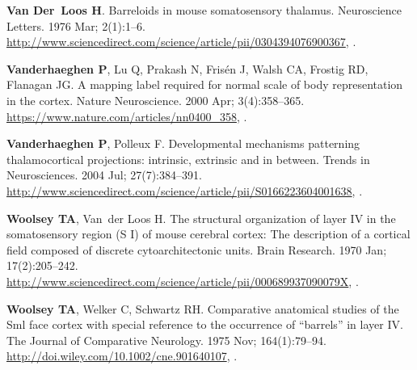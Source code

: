 \documentclass[9pt,lineno]{elife}
\begin{document}
\begin{thebibliography}{31}
\textbf{\color{eLifeMediumGrey} Van Der~Loos H}.
\newblock Barreloids in mouse somatosensory thalamus.
\newblock Neuroscience Letters.  1976 Mar; 2(1):1--6.
\newblock
  \urlprefix\url{http://www.sciencedirect.com/science/article/pii/0304394076900367},
  \href{10.1016/0304-3940(76)90036-7}{\doiprefix
  }.

\textbf{\color{eLifeMediumGrey} Vanderhaeghen P}, Lu Q, Prakash N, Fris{\'e}n
  J, Walsh CA, Frostig RD, Flanagan JG.
\newblock A mapping label required for normal scale of body representation in
  the cortex.
\newblock Nature Neuroscience.  2000 Apr; 3(4):358--365.
\newblock \urlprefix\url{https://www.nature.com/articles/nn0400_358},
  \href{10.1038/73929}{\doiprefix {}}.

\textbf{\color{eLifeMediumGrey} Vanderhaeghen P}, Polleux F.
\newblock Developmental mechanisms patterning thalamocortical projections:
  intrinsic, extrinsic and in between.
\newblock Trends in Neurosciences.  2004 Jul; 27(7):384--391.
\newblock
  \urlprefix\url{http://www.sciencedirect.com/science/article/pii/S0166223604001638},
  \href{10.1016/j.tins.2004.05.009}{\doiprefix
  }.

\textbf{\color{eLifeMediumGrey} Woolsey TA}, Van~der Loos H.
\newblock The structural organization of layer {IV} in the somatosensory region
  ({S} {I}) of mouse cerebral cortex: {The} description of a cortical field
  composed of discrete cytoarchitectonic units.
\newblock Brain Research.  1970 Jan; 17(2):205--242.
\newblock
  \urlprefix\url{http://www.sciencedirect.com/science/article/pii/000689937090079X},
  \href{10.1016/0006-8993(70)90079-X}{\doiprefix
  }.

\textbf{\color{eLifeMediumGrey} Woolsey TA}, Welker C, Schwartz RH.
\newblock Comparative anatomical studies of the {Sml} face cortex with special
  reference to the occurrence of {\textquotedblleft}barrels{\textquotedblright}
  in layer {IV}.
\newblock The Journal of Comparative Neurology.  1975 Nov; 164(1):79--94.
\newblock \urlprefix\url{http://doi.wiley.com/10.1002/cne.901640107},
  \href{10.1002/cne.901640107}{\doiprefix {}}.


\end{thebibliography}
\end{document}
